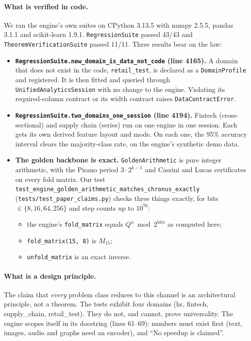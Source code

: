 \documentclass[11pt]{article}
\theoremstyle{definition}
\newcommand{\code}[1]{\texttt{\small #1}}
\begin{document}
\paragraph{What is verified in code.} We ran the engine's own suites on CPython 3.13.5 with numpy 2.5.5, pandas 3.1.1
and scikit-learn 1.9.1. \code{RegressionSuite} passed 43/43 and \code{TheoremVerificationSuite} passed 11/11. Three
results bear on the law:
\begin{itemize}
\item \textbf{\code{RegressionSuite.new\_domain\_is\_data\_not\_code} (line 4165).} A domain that does not exist in
the code, \code{retail\_test}, is declared as a \code{DomainProfile} and registered. It is then fitted and queried
through \code{UnifiedAnalyticsSession} with no change to the engine. Violating its required-column contract or its
width contract raises \code{DataContractError}.
\item \textbf{\code{RegressionSuite.two\_domains\_one\_session} (line 4194).} Fintech (cross-sectional) and supply
chain (series) run on one engine in one session. Each gets its own derived feature layout and mode. On each one, the
95\% accuracy interval clears the majority-class rate, on the engine's synthetic demo data.
\item \textbf{The golden backbone is exact.} \code{GoldenArithmetic} is pure integer arithmetic, with the Pisano
period $3\cdot2^{k-1}$ and Cassini and Lucas certificates on every fold matrix. Our test
\code{test\_engine\_golden\_arithmetic\_matches\_chronus\_exactly} (\code{tests/test\_paper\_claims.py}) checks three
things exactly, for bits $\in\{8,16,64,256\}$ and step counts up to $10^{76}$:
\begin{itemize}
\item the engine's \code{fold\_matrix} equals $Q^n\bmod2^{\mathrm{bits}}$ as computed here;
\item \code{fold\_matrix(15, 8)} is $M_{15}$;
\item \code{unfold\_matrix} is an exact inverse.
\end{itemize}
\end{itemize}

\paragraph{What is a design principle.} The claim that \emph{every} problem class reduces to this channel is an
architectural principle, not a theorem. The tests exhibit four domains (hr, fintech, supply\_chain, retail\_test).
They do not, and cannot, prove universality. The engine scopes itself in its docstring (lines 61--69): numbers must
exist first (text, images, audio and graphs need an encoder), and ``No speedup is claimed''.
\end{document}
